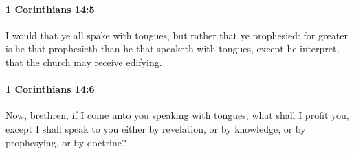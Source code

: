 		\paragraph{1 Corinthians 14:5} %
			\label{1CORINTHIANS-14-5}

			I would that ye all spake with tongues, but rather that ye prophesied: for greater is he that prophesieth than he that speaketh with tongues, except he interpret, that the church may receive edifying.

			\begin{framed}
				\scriptsize
				\begin{compactdesc}
					\item[SBLG] 
				\end{compactdesc}
			\end{framed}

		\paragraph{1 Corinthians 14:6} %
			\label{1CORINTHIANS-14-6}

			Now, brethren, if I come unto you speaking with tongues, what shall I profit you, except I shall speak to you either by revelation, or by knowledge, or by prophesying, or by doctrine?

